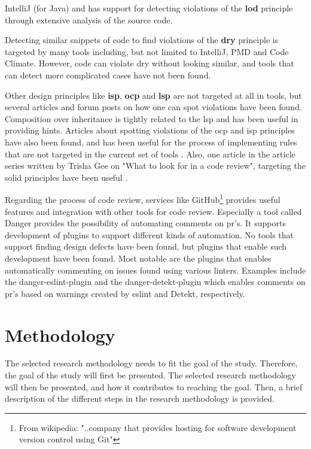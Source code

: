 \documentclass{report}
\begin{document}
IntelliJ \cite{IntelliJ} (for Java) and \cite{pmd} has support for detecting violations of the \textbf{\gls{lod}} principle through extensive analysis of the source code.

Detecting similar snippets of code to find violations of the \textbf{\gls{dry}} principle is targeted by many tools including, but not limited to IntelliJ\cite{IntelliJ}, PMD\cite{pmd} and Code Climate\cite{codeclimate}. However, code can violate \gls{dry} without looking similar, and tools that can detect more complicated cases have not been found.  

Other design principles like \textbf{\gls{isp}}, \textbf{\gls{ocp}} and \textbf{\gls{lsp}} are not targeted at all in tools, but several articles and forum posts on how one can spot violations have been found. Composition over inheritance is tightly related to the \gls{lsp} and \cite{composition-over-inheritance-stackoverflow} has been useful in providing hints. Articles about spotting violations of the \gls{ocp} and \gls{isp} principles have also been found, and has been useful for the process of implementing rules that are not targeted in the current set of tools \cite{ocp-violations} \cite{ocp2} \cite{isp-violation} \cite{ocp3}. Also, one article in the article series written by Trisha Gee on "What to look for in a code review", targeting the \gls{solid} principles have been useful \cite{whattolookforincodereview}.  

Regarding the process of code review, services like GitHub\cite{github}\footnote{From wikipedia: "..company that provides hosting for software development version control using Git"\cite{github-wiki}} provides useful features and integration with other tools for code review. Especially a tool called Danger\cite{danger} provides the possibility of automating comments on \gls{pr}'s. It supports development of plugins to support different kinds of automation. No tools that support finding design defects have been found, but plugins that enable such development have been found. Most notable are the plugins that enables automatically commenting on issues found using various linters. Examples include the danger-eslint-plugin\cite{danger-eslint-plugin} and the danger-detekt-plugin\cite{danger-detekt-plugin} which enables comments on \gls{pr}'s based on warnings created by eslint\cite{eslint} and Detekt\cite{detekt}, respectively. 

\chapter{Methodology}
\label{methodology}
The selected research methodology needs to fit the goal of the study. Therefore, the goal of the study will first be presented. The selected research methodology will then be presented, and how it contributes to reaching the goal. Then, a brief description of the different steps in the research methodology is provided. 
\end{document}
